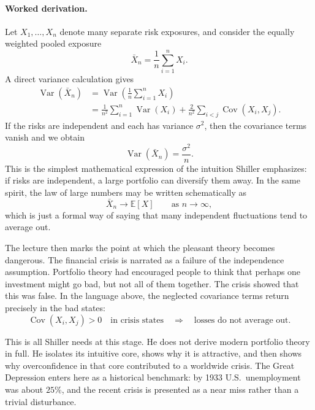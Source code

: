 \paragraph{Worked derivation.}
Let \(X_1,\ldots,X_n\) denote many separate risk exposures, and consider the equally weighted pooled exposure
\begin{equation}
\bar X_n=\frac{1}{n}\sum_{i=1}^n X_i.
\end{equation}
A direct variance calculation gives
\begin{align}
\operatorname{Var}(\bar X_n)
&=\operatorname{Var}\!\left(\frac{1}{n}\sum_{i=1}^n X_i\right) \\
&=\frac{1}{n^2}\sum_{i=1}^n \operatorname{Var}(X_i)
+\frac{2}{n^2}\sum_{i<j}\operatorname{Cov}(X_i,X_j).
\end{align}
If the risks are independent and each has variance \(\sigma^2\), then the covariance terms vanish and we obtain
\begin{equation}
\operatorname{Var}(\bar X_n)=\frac{\sigma^2}{n}.
\end{equation}
This is the simplest mathematical expression of the intuition Shiller emphasizes: if risks are independent, a large portfolio can diversify them away. In the same spirit, the law of large numbers may be written schematically as
\begin{equation}
\bar X_n \to \mathbb E[X]
\qquad \text{as } n\to\infty,
\end{equation}
which is just a formal way of saying that many independent fluctuations tend to average out.

The lecture then marks the point at which the pleasant theory becomes dangerous. The financial crisis is narrated as a failure of the independence assumption. Portfolio theory had encouraged people to think that perhaps one investment might go bad, but not all of them together. The crisis showed that this was false. In the language above, the neglected covariance terms return precisely in the bad states:
\begin{equation}
\operatorname{Cov}(X_i,X_j)>0 \quad \text{in crisis states}
\quad \Longrightarrow \quad
\text{losses do not average out.}
\end{equation}

This is all Shiller needs at this stage. He does not derive modern portfolio theory in full. He isolates its intuitive core, shows why it is attractive, and then shows why overconfidence in that core contributed to a worldwide crisis. The Great Depression enters here as a historical benchmark: by 1933 U.S.\ unemployment was about \(25\%\), and the recent crisis is presented as a near miss rather than a trivial disturbance.


